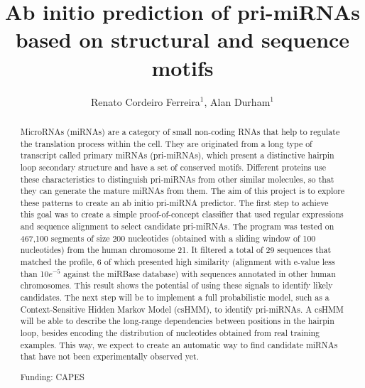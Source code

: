 \documentclass[twoside]{article}
\title{\vspace{-15mm}\fontsize{24pt}{10pt}\selectfont\textbf{Ab initio prediction of pri-miRNAs based on structural and sequence motifs}} %
\author{Renato Cordeiro Ferreira$^1$, Alan Durham$^1$}
\affil{1 IME\\ }
\date{}
\begin{document}
\maketitle %

\thispagestyle{fancy} %


\begin{abstract}
MicroRNAs (miRNAs) are a category of small non-coding RNAs that help to regulate the translation process within the cell. They are originated from a long type of transcript called primary miRNAs (pri-miRNAs), which present a distinctive hairpin loop secondary structure and have a set of conserved motifs. Different proteins use these characteristics to distinguish pri-miRNAs from other similar molecules, so that they can generate the mature miRNAs from them. The aim of this project is to explore these patterns to create an ab initio pri-miRNA predictor. The first step to achieve this goal was to create a simple proof-of-concept classifier that used regular expressions and sequence alignment to select candidate pri-miRNAs. The program was tested on 467,100 segments of size 200 nucleotides (obtained with a sliding window of 100 nucleotides) from the human chromosome 21. It filtered a total of 29 sequences that matched the profile, 6 of which presented high similarity (alignment with e-value less than 10$e^{-5}$ against the miRBase database) with sequences annotated in other human chromosomes. This result shows the potential of using these signals to identify likely candidates. The next step will be to implement a full probabilistic model, such as a Context-Sensitive Hidden Markov Model (csHMM), to identify pri-miRNAs. A csHMM will be able to describe the long-range dependencies between positions in the hairpin loop, besides encoding the distribution of nucleotides obtained from real training examples. This way, we expect to create an automatic way to find candidate miRNAs that have not been experimentally observed yet.

Funding: CAPES
\end{abstract}
\end{document}
